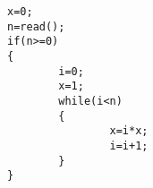 \documentclass{article}
\begin{document}
\begin{lstlisting}
x=0;
n=read();
if(n>=0)
{
        i=0;
        x=1;
        while(i<n)
        {
                x=i*x;
                i=i+1;
        }
}
\end{lstlisting}
\end{document}
